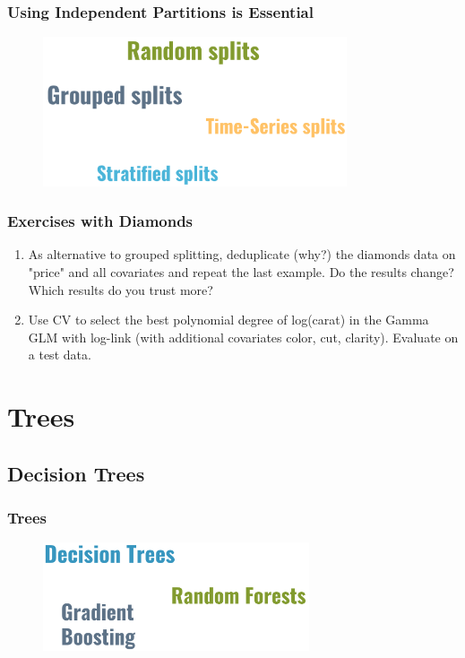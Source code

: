 \documentclass[
    utf8,
    aspectratio=169
]{beamer}  %
\begin{document}
\begin{frame}
	\frametitle{Using Independent Partitions is Essential}
	\begin{figure}
		\includegraphics[width=0.8\textwidth]{pics/validation_independent.png}
	\end{figure}
\end{frame}

\begin{frame}
	\frametitle{Exercises with Diamonds}
	\begin{enumerate}
		\item As alternative to grouped splitting, deduplicate (why?) the diamonds data on "price" and all covariates and repeat the last example. Do the results change? Which results do you trust more?
		
		\vfill
		
		\item Use CV to select the best polynomial degree of log(carat) in the Gamma GLM with log-link (with additional covariates color, cut, clarity). Evaluate on a test data.
	\end{enumerate}
\end{frame}

\section{Trees}

\subsection{Decision Trees}

\begin{frame}
	\frametitle{Trees}
	\begin{figure}
		\includegraphics[width=0.7\textwidth]{pics/tree_outline.png}
	\end{figure}
\end{frame}
\end{document}
